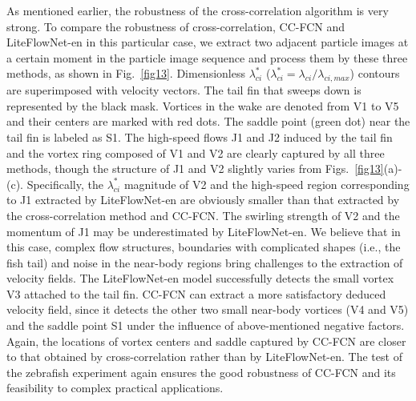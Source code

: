 \documentclass[%
 aip,
 amsmath,amssymb,
 reprint,%
]{revtex4-1}
\begin{document}
As mentioned earlier, the robustness of the cross-correlation algorithm is very strong. To compare the robustness of cross-correlation, CC-FCN and LiteFlowNet-en in this particular case, we extract two adjacent particle images at a certain moment in the particle image sequence and process them by these three methods, as shown in Fig.~\ref{fig13}.
Dimensionless $\lambda_{ci}^{\ast}$ ($\lambda_{ci}^{\ast}=\lambda_{ci}/\lambda_{ci,max}$) contours are superimposed with velocity vectors. 
The tail fin that sweeps down is represented by the black mask.
Vortices in the wake are denoted from V1 to V5 and their centers are marked with red dots. The saddle point (green dot) near the tail fin is labeled as S1. 
The high-speed flows J1 and J2 induced by the tail fin and the vortex ring composed of V1 and V2 are clearly captured by all three methods, though the structure of J1 and V2 slightly varies from Figs.~\ref{fig13}(a)-(c).
Specifically, the $\lambda_{ci}^{\ast}$ magnitude of V2 and the high-speed region corresponding to J1 extracted by LiteFlowNet-en are obviously smaller than that extracted by the cross-correlation method and CC-FCN. 
The swirling strength of V2 and the momentum of J1 may be underestimated by LiteFlowNet-en.
We believe that in this case, complex flow structures, boundaries with complicated shapes (i.e., the fish tail) and noise in the near-body regions bring challenges to the extraction of velocity fields.
The LiteFlowNet-en model successfully detects the small vortex V3 attached to the tail fin. CC-FCN can extract a more satisfactory deduced velocity field, since it detects the other two small near-body vortices (V4 and V5) and the saddle point S1 under the influence of above-mentioned negative factors.
Again, the locations of vortex centers and saddle captured by CC-FCN are closer to that obtained by cross-correlation rather than by LiteFlowNet-en. 
The test of the zebrafish experiment again ensures the good robustness of CC-FCN and its feasibility to complex practical applications. 
\end{document}
